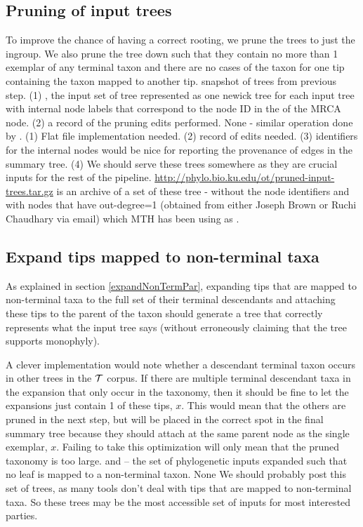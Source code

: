 \documentclass[11pt]{article}
\begin{document}
\subsection{Pruning of input trees}
\stepExplanation To improve the chance of having a correct rooting, we prune
    the trees to just the ingroup.
    We also prune the tree down such that they contain no more than 1 exemplar of any
    terminal taxon and there are no cases of the taxon for one tip containing
    the taxon mapped to another tip.
\stepInput snapshot of \nexson trees from previous step.
\stepOutput (1) \phyloInputs, the input set of tree represented as
    one newick tree for each input tree with internal node labels that 
    correspond to the node ID in the \nexson of the MRCA node.
    (2) a record of the pruning edits performed.
\currImpl None - similar operation done by \gcmdr.
\implTODO (1) Flat file implementation needed. 
    (2) record of edits needed. 
    (3) identifiers for the internal nodes would be nice for reporting the provenance of edges in the 
    summary tree. 
    (4) We should serve these trees somewhere as they are crucial inputs for the rest of the pipeline.
\currURL {} \url{http://phylo.bio.ku.edu/ot/pruned-input-trees.tar.gz} is an
    archive of a set of these tree - without the node identifiers and with nodes that have 
    out-degree=1 (obtained from either Joseph Brown or Ruchi Chaudhary via email) which MTH has been
    using as \phyloInputs.

    \subsection{Expand tips mapped to non-terminal taxa}\label{expandedPhyloStep}
\stepExplanation As explained in section \ref{expandNonTermPar}, expanding tips that are mapped
    to non-terminal taxa to the full set of their terminal descendants and attaching these
    tips to the parent of the taxon should generate a tree that correctly represents
    what the input tree says (without erroneously claiming that the tree supports monophyly).
    
    A clever implementation would note whether a descendant terminal taxon occurs in other
        trees in the $\mathcal{T}$ corpus. 
    If there are multiple terminal descendant taxa in the expansion that only occur in the 
        taxonomy, then it should be fine to let the expansions just contain 1 of these tips, $x$.
    This would mean that the others are pruned in the next step, but will be placed in the 
    correct spot in the final summary tree because they should attach at the same parent node
    as the single exemplar, $x$. Failing to take this optimization will only mean that the 
    pruned taxonomy is too large.
\stepInput \taxonomy and \phyloInputs
\stepOutput \expandedPhylo -- the set of phylogenetic inputs expanded such that no leaf is mapped 
    to a non-terminal taxon.
    \currImpl None
    \implTODO {}
\currURL We should probably post this set of trees, as many tools don't deal with tips that 
are mapped to non-terminal taxa. So these trees may be the most accessible set of inputs
for most interested parties.
 
\end{document}
